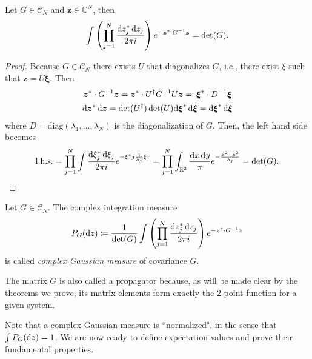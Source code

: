 \begin{lemma}
	Let $G\in\mathcal{C}_N$ and $\boldsymbol{z}\in\mathbb{C}^N$, then
	\begin{align*}
		\int\left(\prod_{j=1}^N\frac{\mathrm{d} z^*_j\,\mathrm{d} z_j}{2\pi i}\right)
		e^{-\boldsymbol{z}^*\cdot G^{-1}\boldsymbol{z}} = \det(G).
	\end{align*}
\end{lemma}
\begin{proof}
	Because $G\in\mathcal{C}_N$ there exists $U$ that diagonalizes $G$, i.e., there exist
	$\xi$ such that $\boldsymbol{z}=U\boldsymbol{\xi}$. Then
	\begin{gather*}
		\boldsymbol{z}^* \cdot G^{-1}\boldsymbol{z}
		= \boldsymbol{z}^*\cdot U^\dagger G^{-1}U\boldsymbol{z} \eqcolon \boldsymbol{\xi}^*\cdot D^{-1}\boldsymbol{\xi}\\
		\mathrm{d}\boldsymbol{z}^*\,\mathrm{d}\boldsymbol{z} = \det(U^\dagger)\det(U)\mathrm{d}\boldsymbol{\xi}^*\,\mathrm{d}\boldsymbol{\xi}
		= \mathrm{d}\boldsymbol{\xi}^*\,\mathrm{d}\boldsymbol{\xi}
	\end{gather*}
	where $D=\mathrm{diag}(\lambda_1,\ldots,\lambda_N)$ is the diagonalization of $G$. Then, the left
	hand side becomes
	\begin{align*}
		\mathrm{l.h.s.}
		= \prod_{j=1}^N\int\frac{\mathrm{d} \xi^*_j\,\mathrm{d} \xi_j}{2\pi i} e^{-\xi^*j\frac{1}{\lambda_j}\xi_j}
		= \prod_{j=1}^N\int_{\mathbb{R}^2}\frac{\mathrm{d} x\,\mathrm{d} y}{\pi}e^{-\frac{x^2+y^2}{\lambda_j}}
		= \det(G).
	\end{align*}
\end{proof}

\begin{definition}
	Let $G\in\mathcal{C}_N$. The complex integration measure
	\begin{align*}
		P_G(\mathrm{d} z) \coloneq \frac{1}{\det(G)}\int\left(\prod_{j=1}^N\frac{\mathrm{d} z^*_j\,\mathrm{d} z_j}{2\pi i}\right)
		e^{-\boldsymbol{z}^*\cdot G^{-1}\boldsymbol{z}}
	\end{align*}
	is called \textit{complex Gaussian measure} of covariance $G$.
\end{definition}
\begin{remark}
	The matrix $G$ is also called a propagator because, as will be made clear by the theorems
	we prove, its matrix elements form exactly the 2-point function for a given system.
\end{remark}

Note that a complex Gaussian measure is ``normalized", in the sense that $\int P_G(\mathrm{d} z)=1$.
We are now ready to define expectation values and prove their fundamental properties.

